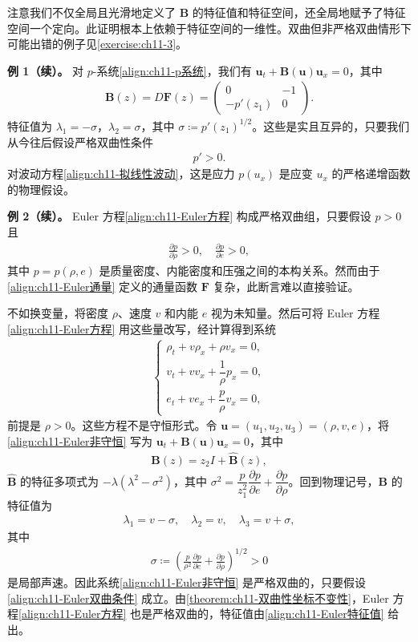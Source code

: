 \documentclass[../../main.tex]{subfiles}
\begin{document}
注意我们不仅全局且光滑地定义了 $\mathbf{B}$ 的特征值和特征空间，还全局地赋予了特征空间一个定向。此证明根本上依赖于特征空间的一维性。双曲但非严格双曲情形下可能出错的例子见\cref{exercise:ch11-3}。

\textbf{例 1（续）。} 对 $p$-系统\eqref{align:ch11-p系统}，我们有 $\mathbf{u}_t+\mathbf{B}(\mathbf{u})\mathbf{u}_x=0$，其中
\begin{align*}
\mathbf{B}(z)=D\mathbf{F}(z)=\begin{pmatrix}0 & -1\\ -p'(z_1) & 0\end{pmatrix}.
\end{align*}
特征值为 $\lambda_1=-\sigma$，$\lambda_2=\sigma$，其中 $\sigma\coloneqq p'(z_1)^{1/2}$。这些是实且互异的，只要我们从今往后假设严格双曲性条件
\begin{align}
p'>0.
\label{align:ch11-p系统严格双曲}
\end{align}
对波动方程\eqref{align:ch11-拟线性波动}，这是应力 $p(u_x)$ 是应变 $u_x$ 的严格递增函数的物理假设。

\textbf{例 2（续）。} Euler 方程\eqref{align:ch11-Euler方程} 构成严格双曲组，只要假设 $p>0$ 且
\begin{align}
\frac{\partial p}{\partial\rho}>0,\quad \frac{\partial p}{\partial e}>0,
\label{align:ch11-Euler双曲条件}
\end{align}
其中 $p=p(\rho,e)$ 是质量密度、内能密度和压强之间的本构关系。然而由于\eqref{align:ch11-Euler通量} 定义的通量函数 $\mathbf{F}$ 复杂，此断言难以直接验证。

不如换变量，将密度 $\rho$、速度 $v$ 和内能 $e$ 视为未知量。然后可将 Euler 方程\eqref{align:ch11-Euler方程} 用这些量改写，经计算得到系统
\begin{align}
\begin{cases}
\rho_t+v\rho_x+\rho v_x=0,\\
v_t+vv_x+\dfrac{1}{\rho}p_x=0,\\
e_t+ve_x+\dfrac{p}{\rho}v_x=0,
\end{cases}
\label{align:ch11-Euler非守恒}
\end{align}
前提是 $\rho>0$。这些方程不是守恒形式。令 $\mathbf{u}=(u_1,u_2,u_3)=(\rho,v,e)$，将\eqref{align:ch11-Euler非守恒} 写为 $\mathbf{u}_t+\mathbf{B}(\mathbf{u})\mathbf{u}_x=0$，其中
\begin{align*}
\mathbf{B}(z)=z_2 I+\widehat{\mathbf{B}}(z),
\end{align*}
$\widehat{\mathbf{B}}$ 的特征多项式为 $-\lambda(\lambda^2-\sigma^2)$，其中 $\sigma^2=\dfrac{p}{z_1^2}\dfrac{\partial p}{\partial e}+\dfrac{\partial p}{\partial\rho}$。回到物理记号，$\mathbf{B}$ 的特征值为
\begin{align}
\lambda_1=v-\sigma,\quad \lambda_2=v,\quad \lambda_3=v+\sigma,
\label{align:ch11-Euler特征值}
\end{align}
其中
\begin{align*}
\sigma\coloneqq\left(\frac{p}{\rho^2}\frac{\partial p}{\partial e}+\frac{\partial p}{\partial\rho}\right)^{1/2}>0
\end{align*}
是局部声速。因此系统\eqref{align:ch11-Euler非守恒} 是严格双曲的，只要假设\eqref{align:ch11-Euler双曲条件} 成立。由\cref{theorem:ch11-双曲性坐标不变性}，Euler 方程\eqref{align:ch11-Euler方程} 也是严格双曲的，特征值由\eqref{align:ch11-Euler特征值} 给出。
\end{document}

